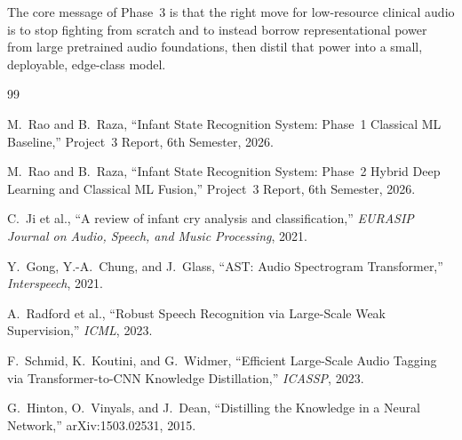 \documentclass[11pt,a4paper]{article}
\begin{document}
The core message of Phase~3 is that the right move for low-resource
clinical audio is to stop fighting from scratch and to instead borrow
representational power from large pretrained audio foundations, then
distil that power into a small, deployable, edge-class model.

\begin{thebibliography}{99}

M.~Rao and B.~Raza,
``Infant State Recognition System: Phase~1 Classical ML Baseline,''
Project~3 Report, 6th Semester, 2026.

M.~Rao and B.~Raza,
``Infant State Recognition System: Phase~2 Hybrid Deep Learning and
Classical ML Fusion,'' Project~3 Report, 6th Semester, 2026.

C.~Ji et al., ``A review of infant cry analysis and classification,''
\emph{EURASIP Journal on Audio, Speech, and Music Processing}, 2021.

Y.~Gong, Y.-A.~Chung, and J.~Glass,
``AST: Audio Spectrogram Transformer,'' \emph{Interspeech}, 2021.

A.~Radford et al., ``Robust Speech Recognition via Large-Scale Weak
Supervision,'' \emph{ICML}, 2023.

F.~Schmid, K.~Koutini, and G.~Widmer,
``Efficient Large-Scale Audio Tagging via Transformer-to-CNN Knowledge
Distillation,'' \emph{ICASSP}, 2023.

G.~Hinton, O.~Vinyals, and J.~Dean,
``Distilling the Knowledge in a Neural Network,'' arXiv:1503.02531,
2015.

\end{thebibliography}
\end{document}

